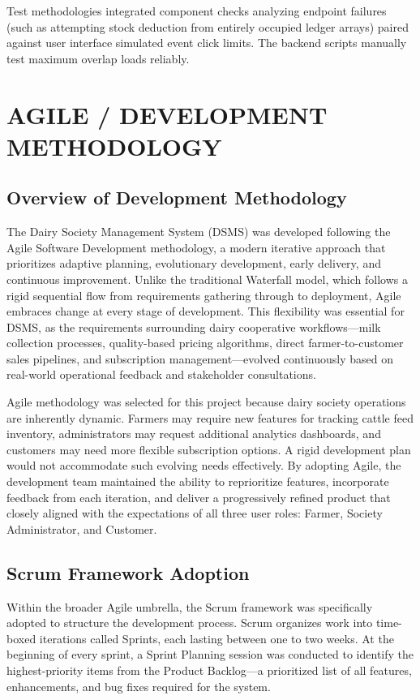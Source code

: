 \documentclass[12pt,a4paper]{report}
\begin{document}
Test methodologies integrated component checks analyzing endpoint failures (such as attempting stock deduction from entirely occupied ledger arrays) paired against user interface simulated event click limits. The backend scripts manually test maximum overlap loads reliably.

\chapter{AGILE / DEVELOPMENT METHODOLOGY}
\section{Overview of Development Methodology}
\vspace{0.5cm}
The Dairy Society Management System (DSMS) was developed following the Agile Software Development methodology, a modern iterative approach that prioritizes adaptive planning, evolutionary development, early delivery, and continuous improvement. Unlike the traditional Waterfall model, which follows a rigid sequential flow from requirements gathering through to deployment, Agile embraces change at every stage of development. This flexibility was essential for DSMS, as the requirements surrounding dairy cooperative workflows—milk collection processes, quality-based pricing algorithms, direct farmer-to-customer sales pipelines, and subscription management—evolved continuously based on real-world operational feedback and stakeholder consultations.

Agile methodology was selected for this project because dairy society operations are inherently dynamic. Farmers may require new features for tracking cattle feed inventory, administrators may request additional analytics dashboards, and customers may need more flexible subscription options. A rigid development plan would not accommodate such evolving needs effectively. By adopting Agile, the development team maintained the ability to reprioritize features, incorporate feedback from each iteration, and deliver a progressively refined product that closely aligned with the expectations of all three user roles: Farmer, Society Administrator, and Customer.

\section{Scrum Framework Adoption}
\vspace{0.5cm}
Within the broader Agile umbrella, the Scrum framework was specifically adopted to structure the development process. Scrum organizes work into time-boxed iterations called Sprints, each lasting between one to two weeks. At the beginning of every sprint, a Sprint Planning session was conducted to identify the highest-priority items from the Product Backlog—a prioritized list of all features, enhancements, and bug fixes required for the system.
\end{document}

